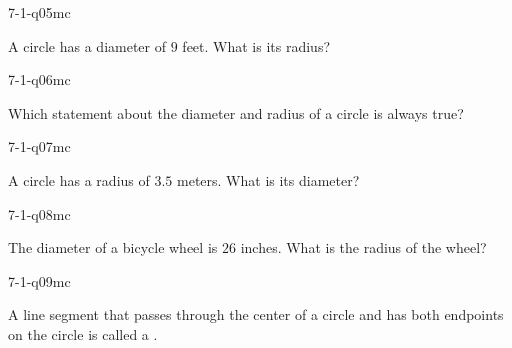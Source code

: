 \begin{practiceQuestion}{7-1-q05}{mc}
\begin{questionText}
A circle has a diameter of $9$ feet. What is its radius?
\end{questionText}
\end{practiceQuestion}

\begin{practiceQuestion}{7-1-q06}{mc}
\begin{questionText}
Which statement about the diameter and radius of a circle is always true?
\end{questionText}
\end{practiceQuestion}

\begin{practiceQuestion}{7-1-q07}{mc}
\begin{questionText}
A circle has a radius of $3.5$ meters. What is its diameter?
\end{questionText}
\end{practiceQuestion}

\begin{practiceQuestion}{7-1-q08}{mc}
\begin{questionText}
The diameter of a bicycle wheel is $26$ inches. What is the radius of the wheel?
\end{questionText}
\end{practiceQuestion}

\begin{practiceQuestion}{7-1-q09}{mc}
\begin{questionText}
A line segment that passes through the center of a circle and has both endpoints on the circle is called a \underline{\hspace{1.5cm}}.
\end{questionText}
\end{practiceQuestion}

